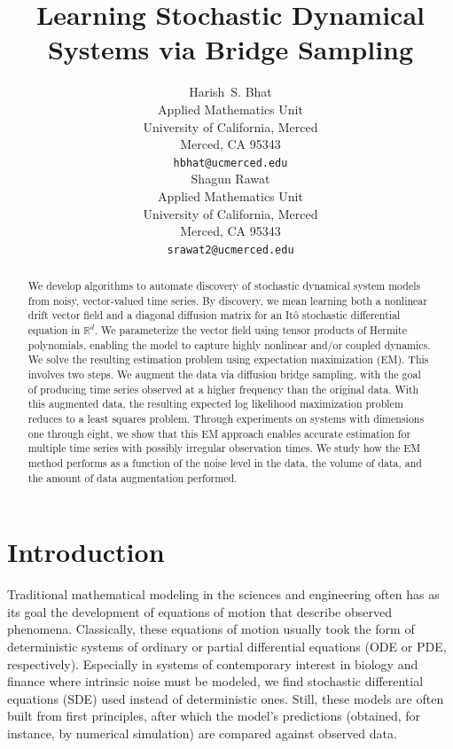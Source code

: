 \documentclass{article}
\title{Learning Stochastic Dynamical Systems via Bridge Sampling}
\author{
 Harish~S. Bhat\\
 Applied Mathematics Unit\\
 University of California, Merced\\
 Merced, CA 95343\\
 \texttt{hbhat@ucmerced.edu} \\
 \And
 Shagun Rawat\\
 Applied Mathematics Unit\\
 University of California, Merced\\
 Merced, CA 95343\\
 \texttt{srawat2@ucmerced.edu}
}
\begin{document}
\maketitle


\begin{abstract}
  We develop algorithms to automate discovery of stochastic dynamical system
  models from noisy, vector-valued time series.  By discovery, we mean 
  learning both a nonlinear drift vector field and a diagonal diffusion matrix 
  for an It\^{o} stochastic differential equation in $\mathbb{R}^d$.  We 
  parameterize the vector field using tensor products of Hermite polynomials,
  enabling the model to capture highly nonlinear and/or coupled dynamics.
  We solve the resulting estimation problem using expectation maximization (EM).
  This involves two steps.  We augment the data via diffusion bridge
  sampling, with the goal of producing time series observed at a higher
  frequency than the original data.  With this augmented data,
  the resulting expected log likelihood maximization problem
  reduces to a least squares problem.  Through experiments on systems with 
  dimensions one through eight, we show that this EM approach enables 
  accurate estimation for multiple time series with possibly irregular 
  observation times.  We study how the EM method performs as a function of
  the noise level in the data, the volume of data, and the amount of data
  augmentation performed.  
\end{abstract}

\section{Introduction}
Traditional mathematical modeling in the sciences and engineering often has as its goal the development of equations of motion that describe observed phenomena.  Classically, these equations of motion usually took the form of deterministic systems of ordinary or partial differential equations (ODE or PDE, respectively).  Especially in systems of contemporary interest in biology and finance where intrinsic noise must be modeled, we find stochastic differential equations (SDE) used instead of deterministic ones.  Still, these models are often built from first principles, after which the model's predictions (obtained, for instance, by numerical simulation) are compared against observed data.
\end{document}
